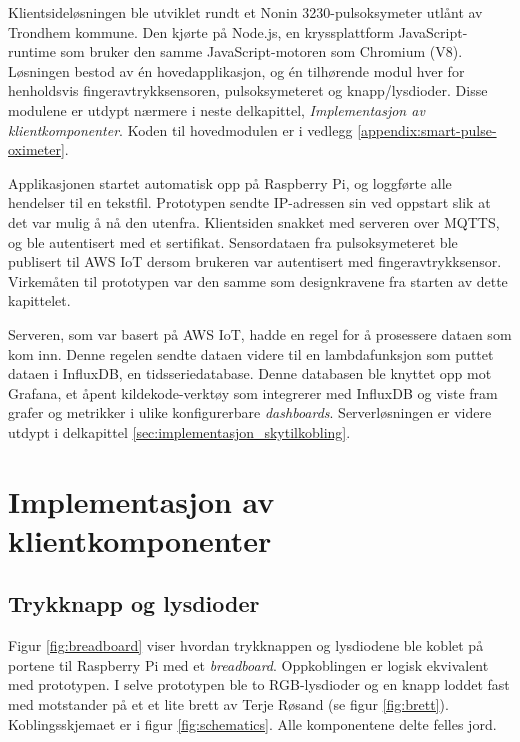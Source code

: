 Klientsideløsningen ble utviklet rundt
et Nonin 3230-pulsoksymeter utlånt av Trondhem kommune. Den kjørte på Node.js, en kryssplattform JavaScript-runtime som bruker den
samme JavaScript-motoren som Chromium (V8). Løsningen bestod av én hovedapplikasjon, og én tilhørende modul hver for henholdsvis fingeravtrykksensoren,
pulsoksymeteret og knapp/lysdioder. Disse modulene er utdypt nærmere i neste delkapittel, \textit{Implementasjon av klientkomponenter}.
Koden til hovedmodulen er i vedlegg \ref{appendix:smart-pulse-oximeter}.

Applikasjonen startet automatisk opp på Raspberry Pi, og loggførte alle hendelser til en tekstfil.
Prototypen sendte IP-adressen sin ved oppstart slik at det var mulig å nå den utenfra.
Klientsiden snakket med serveren over MQTTS, og ble autentisert med et sertifikat. Sensordataen fra pulsoksymeteret ble publisert til
AWS IoT dersom brukeren var autentisert med fingeravtrykksensor. Virkemåten til prototypen var den samme som designkravene 
fra starten av dette kapittelet.

Serveren, som var basert på AWS IoT, hadde en
regel for å prosessere dataen som kom inn. Denne regelen sendte dataen videre til en lambdafunksjon som puttet dataen
i InfluxDB, en tidsseriedatabase. Denne databasen ble knyttet opp mot Grafana, et åpent kildekode-verktøy som integrerer
med InfluxDB og viste fram grafer og metrikker i ulike konfigurerbare \textit{dashboards}.
Serverløsningen er videre utdypt i delkapittel \ref{sec:implementasjon_skytilkobling}.

\section{Implementasjon av klientkomponenter}

\subsection{Trykknapp og lysdioder}
Figur \ref{fig:breadboard} viser hvordan trykknappen og lysdiodene ble koblet på
portene til Raspberry Pi med et \textit{breadboard}. Oppkoblingen er logisk ekvivalent med prototypen.
I selve prototypen ble to RGB-lysdioder og en knapp loddet fast med motstander på et et lite brett av Terje Røsand (se figur \ref{fig:brett}).
Koblingsskjemaet er i figur \ref{fig:schematics}. Alle komponentene delte felles jord.

